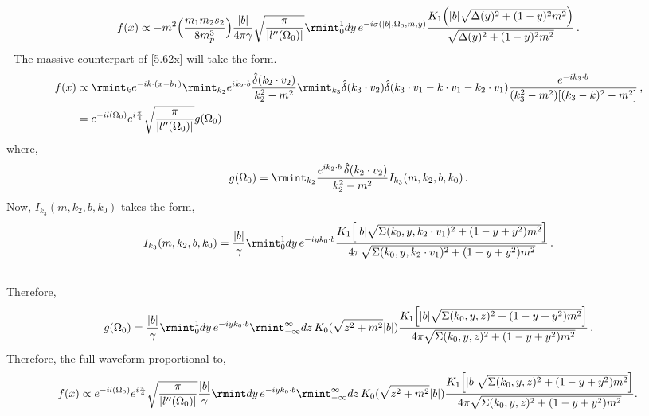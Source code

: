 \begin{align}
    \begin{split} 
           f(x)\propto -m^2\Big(\frac{m_1m_2s_2}{8m_p^3}\Big)\frac{|b|}{4\pi\gamma}\sqrt{\frac{\pi}{|l''(\Omega_0)|}}\rmint_0^1 dy\,e^{-i\sigma(|b|,\Omega_0,m,y)}\frac{K_1\Big(|b|\sqrt{\Delta(y)^2+(1-y)^2m^2}\Big)}{\sqrt{\Delta(y)^2+(1-y)^2m^2}}\,.
    \end{split}
\end{align}
\textbullet $\,\,$ The massive counterpart of \eqref{5.62x} will take the form.
\begin{align}
    \begin{split}
        f(x)&\propto \rmint_{k}e^{-ik\cdot (x-b_1)}\rmint_{k_2} e^{ik_2\cdot b}\frac{\hat\delta(k_2\cdot v_2)}{k_2^2-m^2}\rmint_{k_3}\hat\delta(k_3\cdot v_2)\hat\delta(k_3\cdot v_1-k\cdot v_1-k_2\cdot v_1)\frac{e^{-ik_3\cdot b}}{(k_3^2-m^2)[(k_3-k)^2-m^2]}\,,\\ &
        =e^{-il(\Omega_0)}e^{i\frac{\pi}{4}}\sqrt{\frac{\pi}{|l''(\Omega_0)|}}g(\Omega_0)
    \end{split}
\end{align}
where,
\begin{align}
    \begin{split}
        g(\Omega_0)=\rmint_{k_2}\frac{e^{i k_2\cdot b}\,\hat\delta(k_2\cdot v_2)}{k_2^2-m^2}I_{k_3}(m,k_2,b,k_0)\,.
    \end{split}
\end{align}
Now, $I_{k_3}(m,k_2,b,k_0)$ takes the form,
\begin{align}
    \begin{split}
        I_{k_3}(m,k_2,b,k_0)&=\frac{|b|}{\gamma}\rmint_0^1dy\,e^{-iyk_0\cdot b}\frac{K_1\Big[|b|\sqrt{\Sigma(k_0,y,k_2\cdot v_1)^2+(1-y+y^2)m^2}\Big]}{4\pi\sqrt{ \Sigma(k_0,y,k_2\cdot v_1)^2+(1-y+y^2)m^2}}\,.\\ &
    \end{split}
\end{align}
Therefore, 
\begin{align}
    \begin{split}
        g(\Omega_0)=\frac{|b|}{\gamma}\rmint_0^1 dy\,e^{-iy k_0\cdot b}\rmint_{-\infty}^{\infty} dz\, K_{0}(\sqrt{z^2+m^2}|b|)\frac{K_1\Big[|b|\sqrt{\Sigma(k_0,y,z)^2+(1-y+y^2)m^2}\Big]}{4\pi\sqrt{ \Sigma(k_0,y,z)^2+(1-y+y^2)m^2}}\,.
    \end{split}
\end{align}
Therefore, the full waveform proportional to,
\begin{align}
    \begin{split}
     f(x)\propto e^{-il(\Omega_0)}e^{i\frac{\pi}{4}}\sqrt{\frac{\pi}{|l''(\Omega_0)|}}\frac{|b|}{\gamma}\rmint dy\,e^{-iy k_0\cdot b}\rmint_{-\infty}^{\infty} dz\, K_{0}(\sqrt{z^2+m^2}|b|)\frac{K_1\Big[|b|\sqrt{\Sigma(k_0,y,z)^2+(1-y+y^2)m^2}\Big]}{4\pi\sqrt{ \Sigma(k_0,y,z)^2+(1-y+y^2)m^2}}.\,
    \end{split}
\end{align}
